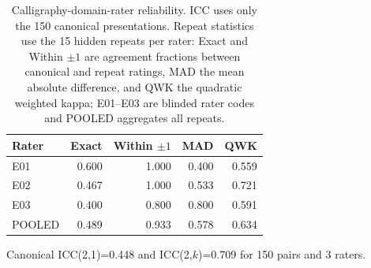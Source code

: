 \begin{table}[t]
\caption{Calligraphy-domain-rater reliability. ICC uses only the 150 canonical
presentations. Repeat statistics use the 15 hidden repeats per rater: Exact
and Within \(\pm1\) are agreement fractions between canonical and repeat
ratings, MAD the mean absolute difference, and QWK the quadratic weighted
kappa; E01--E03 are blinded rater codes and POOLED aggregates all repeats.}
\label{tab:rater-reliability}
\centering
\small
\begin{tabular}{lrrrr}
\toprule
Rater & Exact & Within $\pm 1$ & MAD & QWK \\
\midrule
E01 & 0.600 & 1.000 & 0.400 & 0.559 \\
E02 & 0.467 & 1.000 & 0.533 & 0.721 \\
E03 & 0.400 & 0.800 & 0.800 & 0.591 \\
POOLED & 0.489 & 0.933 & 0.578 & 0.634 \\
\bottomrule
\end{tabular}
\vspace{2pt}
\begin{minipage}{0.96\columnwidth}\footnotesize
Canonical ICC(2,1)=0.448 and
ICC(2,$k$)=0.709 for
150 pairs and 3 raters.
\end{minipage}
\end{table}
